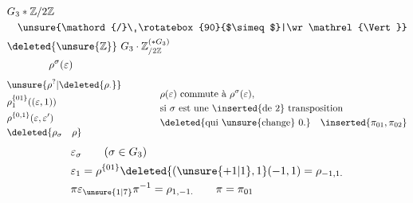 \[
\begin{aligned}
 &G_3*\mathbb Z/2\mathbb Z\\
 &\quad\unsure{\mathord{/}\ \rotatebox{90}{$\simeq$}|\wr\mathrel{\Vert}}\\
 &\deleted{\unsure{\mathbb Z}}\ G_3\cdot{\mathbb Z}_{/2\mathbb Z}^{(*G_3)}\\
 &\qquad\qquad\rho^\sigma(\varepsilon)
\end{aligned}
\]
\[
\begin{aligned}
&\unsure{\rho^{?}|\deleted{\rho_{\cdot}}}\qquad\\
&\rho_1^{\{01\}}((\varepsilon,1))\\
&\rho^{\{0,1\}}(\varepsilon,\varepsilon')\\
&\deleted{\rho_\sigma\quad\rho}
\end{aligned}
\qquad
\begin{aligned}
 &\rho(\varepsilon)\ \text{commute à}\ \rho^\sigma(\varepsilon),\\
 &\text{si }\sigma\text{ est une \inserted{de 2} transposition}\\
 &\deleted{\text{qui \unsure{change} }0.}\quad\inserted{\pi_{01},\pi_{02}}
\end{aligned}
\]
\[
\begin{aligned}
 &\varepsilon_\sigma\qquad(\sigma\in G_3)\\
 &\varepsilon_1=\rho^{\{01\}}\deleted{(\unsure{+1|1},1}(-1,1)=\rho_{-1,1.}\\
 &\pi\varepsilon_{\unsure{1|7}}\pi^{-1}=\rho_{1,-1.}\qquad\pi=\pi_{01}
\end{aligned}
\]
